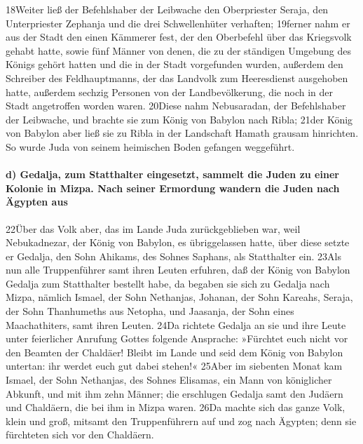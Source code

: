 18Weiter ließ der Befehlshaber der Leibwache den Oberpriester Seraja,
den Unterpriester Zephanja und die drei Schwellenhüter verhaften;
19ferner nahm er aus der Stadt den einen Kämmerer fest, der den
Oberbefehl über das Kriegsvolk gehabt hatte, sowie fünf Männer von
denen, die zu der ständigen Umgebung des Königs gehört hatten und die in
der Stadt vorgefunden wurden, außerdem den Schreiber des Feldhauptmanns,
der das Landvolk zum Heeresdienst ausgehoben hatte, außerdem sechzig
Personen von der Landbevölkerung, die noch in der Stadt angetroffen
worden waren. 20Diese nahm Nebusaradan, der Befehlshaber der Leibwache,
und brachte sie zum König von Babylon nach Ribla; 21der König von
Babylon aber ließ sie zu Ribla in der Landschaft Hamath grausam
hinrichten. So wurde Juda von seinem heimischen Boden gefangen
weggeführt.

\hypertarget{d-gedalja-zum-statthalter-eingesetzt-sammelt-die-juden-zu-einer-kolonie-in-mizpa.-nach-seiner-ermordung-wandern-die-juden-nach-uxe4gypten-aus}{%
\paragraph{d) Gedalja, zum Statthalter eingesetzt, sammelt die Juden zu
einer Kolonie in Mizpa. Nach seiner Ermordung wandern die Juden nach
Ägypten
aus}\label{d-gedalja-zum-statthalter-eingesetzt-sammelt-die-juden-zu-einer-kolonie-in-mizpa.-nach-seiner-ermordung-wandern-die-juden-nach-uxe4gypten-aus}}

22Über das Volk aber, das im Lande Juda zurückgeblieben war, weil
Nebukadnezar, der König von Babylon, es übriggelassen hatte, über diese
setzte er Gedalja, den Sohn Ahikams, des Sohnes Saphans, als Statthalter
ein. 23Als nun alle Truppenführer samt ihren Leuten erfuhren, daß der
König von Babylon Gedalja zum Statthalter bestellt habe, da begaben sie
sich zu Gedalja nach Mizpa, nämlich Ismael, der Sohn Nethanjas, Johanan,
der Sohn Kareahs, Seraja, der Sohn Thanhumeths aus Netopha, und
Jaasanja, der Sohn eines Maachathiters, samt ihren Leuten. 24Da richtete
Gedalja an sie und ihre Leute unter feierlicher Anrufung Gottes folgende
Ansprache: »Fürchtet euch nicht vor den Beamten der Chaldäer! Bleibt im
Lande und seid dem König von Babylon untertan: ihr werdet euch gut dabei
stehen!« 25Aber im siebenten Monat kam Ismael, der Sohn Nethanjas, des
Sohnes Elisamas, ein Mann von königlicher Abkunft, und mit ihm zehn
Männer; die erschlugen Gedalja samt den Judäern und Chaldäern, die bei
ihm in Mizpa waren. 26Da machte sich das ganze Volk, klein und groß,
mitsamt den Truppenführern auf und zog nach Ägypten; denn sie fürchteten
sich vor den Chaldäern.

